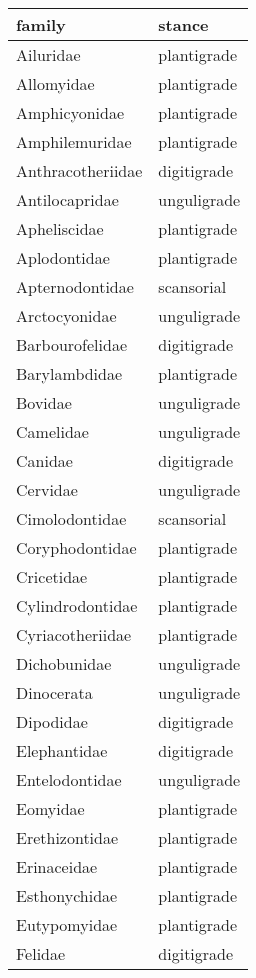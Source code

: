 \begin{table}[ht]
\centering
\begin{tabular}{ll}
  \hline
family & stance \\ 
  \hline
Ailuridae & plantigrade \\ 
  Allomyidae & plantigrade \\ 
  Amphicyonidae & plantigrade \\ 
  Amphilemuridae & plantigrade \\ 
  Anthracotheriidae & digitigrade \\ 
  Antilocapridae & unguligrade \\ 
  Apheliscidae & plantigrade \\ 
  Aplodontidae & plantigrade \\ 
  Apternodontidae & scansorial \\ 
  Arctocyonidae & unguligrade \\ 
  Barbourofelidae & digitigrade \\ 
  Barylambdidae & plantigrade \\ 
  Bovidae & unguligrade \\ 
  Camelidae & unguligrade \\ 
  Canidae & digitigrade \\ 
  Cervidae & unguligrade \\ 
  Cimolodontidae & scansorial \\ 
  Coryphodontidae & plantigrade \\ 
  Cricetidae & plantigrade \\ 
  Cylindrodontidae & plantigrade \\ 
  Cyriacotheriidae & plantigrade \\ 
  Dichobunidae & unguligrade \\ 
  Dinocerata & unguligrade \\ 
  Dipodidae & digitigrade \\ 
  Elephantidae & digitigrade \\ 
  Entelodontidae & unguligrade \\ 
  Eomyidae & plantigrade \\ 
  Erethizontidae & plantigrade \\ 
  Erinaceidae & plantigrade \\ 
  Esthonychidae & plantigrade \\ 
  Eutypomyidae & plantigrade \\ 
  Felidae & digitigrade \\ 

\end{tabular}
\end{table}
